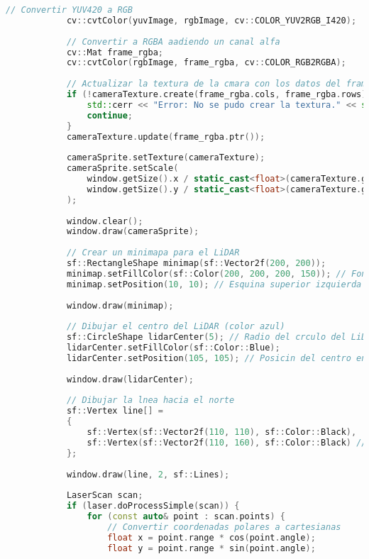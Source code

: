 \begin{lstlisting}[language={C++}, caption={Primer ajuste de c\'odigo}, label={PrimerAjuste}]
            // Convertir YUV420 a RGB
            cv::cvtColor(yuvImage, rgbImage, cv::COLOR_YUV2RGB_I420);
    
            // Convertir a RGBA aadiendo un canal alfa
            cv::Mat frame_rgba;
            cv::cvtColor(rgbImage, frame_rgba, cv::COLOR_RGB2RGBA);
    
            // Actualizar la textura de la cmara con los datos del frame
            if (!cameraTexture.create(frame_rgba.cols, frame_rgba.rows)) {
                std::cerr << "Error: No se pudo crear la textura." << std::endl;
                continue;
            }
            cameraTexture.update(frame_rgba.ptr());
    
            cameraSprite.setTexture(cameraTexture);
            cameraSprite.setScale(
                window.getSize().x / static_cast<float>(cameraTexture.getSize().x),
                window.getSize().y / static_cast<float>(cameraTexture.getSize().y)
            );
    
            window.clear();
            window.draw(cameraSprite);
    
            // Crear un minimapa para el LiDAR
            sf::RectangleShape minimap(sf::Vector2f(200, 200));
            minimap.setFillColor(sf::Color(200, 200, 200, 150)); // Fondo semitransparente
            minimap.setPosition(10, 10); // Esquina superior izquierda
    
            window.draw(minimap);
    
            // Dibujar el centro del LiDAR (color azul)
            sf::CircleShape lidarCenter(5); // Radio del crculo del LiDAR
            lidarCenter.setFillColor(sf::Color::Blue);
            lidarCenter.setPosition(105, 105); // Posicin del centro en el minimapa
    
            window.draw(lidarCenter);
    
            // Dibujar la lnea hacia el norte
            sf::Vertex line[] =
            {
                sf::Vertex(sf::Vector2f(110, 110), sf::Color::Black),
                sf::Vertex(sf::Vector2f(110, 160), sf::Color::Black) // Lnea hacia arriba (norte)
            };
    
            window.draw(line, 2, sf::Lines);
    
            LaserScan scan;
            if (laser.doProcessSimple(scan)) {
                for (const auto& point : scan.points) {
                    // Convertir coordenadas polares a cartesianas
                    float x = point.range * cos(point.angle);
                    float y = point.range * sin(point.angle);
    

\end{lstlisting}
